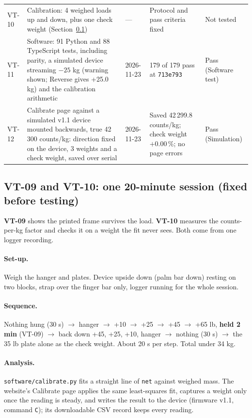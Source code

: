 \documentclass[10pt,a4paper]{article}
\newcommand{\simul}{Simulation}
\newcommand{\swt}{Software test}
\newcommand{\nt}{\textcolor{warn}{Not tested}}
\begin{document}
\begin{small}
\begin{longtable}{@{}p{1.1cm}P{3.3cm}p{1.6cm}P{5.2cm}P{2.6cm}@{}}
VT-10 & Calibration: 4 weighed loads up and down, plus one check weight (Section~\ref{sec:vt10}) & — & Protocol and pass criteria fixed & \nt \\
VT-11 & Software: 91 Python and 88 TypeScript tests, including parity, a simulated device streaming $-25$ kg (warning shown; Reverse gives +25.0 kg) and the calibration arithmetic & 2026-11-23 & 179 of 179 pass at \texttt{713e793} & Pass (\swt) \\
VT-12 & Calibrate page against a simulated v1.1 device mounted backwards, true 42\,300 counts/kg: direction fixed on the device, 3 weights and a check weight, saved over serial & 2026-11-23 & Saved 42\,299.8 counts/kg; check weight $+0.00$\,\%; no page errors & Pass (\simul) \\
\bottomrule
\end{longtable}
\end{small}

\subsection{VT-09 and VT-10: one 20-minute session (fixed before testing)}\label{sec:vt10}

\textbf{VT-09} shows the printed frame survives the load. \textbf{VT-10} measures the counts-per-kg factor and checks it on a weight the fit never sees. Both come from one logger recording.

\paragraph{Set-up.} Weigh the hanger and plates. Device upside down (palm bar down) resting on two blocks, strap over the finger bar only, logger running for the whole session.

\paragraph{Sequence.} Nothing hung (30 s) $\rightarrow$ hanger $\rightarrow$ +10 $\rightarrow$ +25 $\rightarrow$ +45 $\rightarrow$ +65 lb, \textbf{held 2 min} (VT-09) $\rightarrow$ back down +45, +25, +10, hanger $\rightarrow$ nothing (30 s) $\rightarrow$ the 35 lb plate alone as the check weight. About 20 s per step. Total under 34 kg.

\paragraph{Analysis.} \texttt{software/calibrate.py} fits a straight line of \texttt{net} against weighed mass. The website's Calibrate page applies the same least-squares fit, captures a weight only once the reading is steady, and writes the result to the device (firmware v1.1, command \texttt{C}); its downloadable CSV record keeps every reading.
\end{document}
